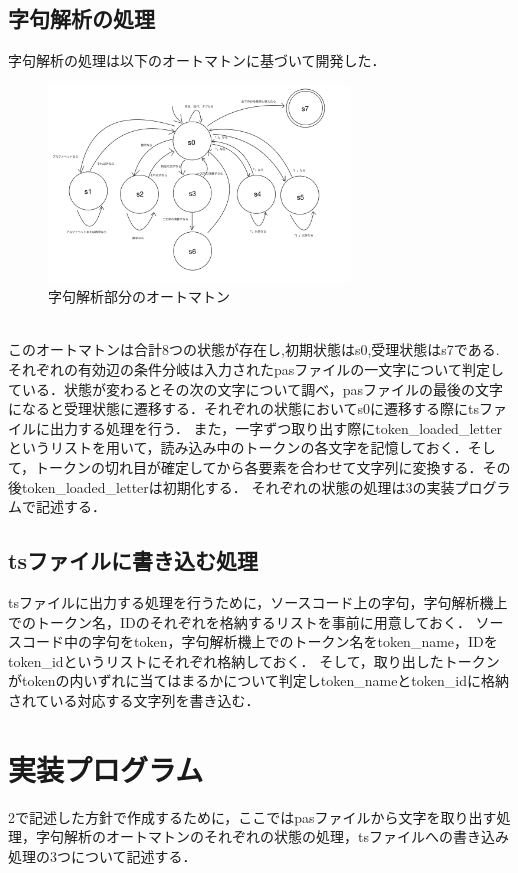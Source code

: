 \documentclass[dvipdfmx]{jarticle}
\begin{document}
\subsection{字句解析の処理}
字句解析の処理は以下のオートマトンに基づいて開発した．
\begin{figure}[h]
    \centering
    \includegraphics[width = 8cm, angle = -90]{automaton.png}
    \caption{字句解析部分のオートマトン}
\end{figure}
\\このオートマトンは合計8つの状態が存在し,初期状態はs0,受理状態はs7である.それぞれの有効辺の条件分岐は入力されたpasファイルの一文字について判定している．状態が変わるとその次の文字について調べ，pasファイルの最後の文字になると受理状態に遷移する．それぞれの状態においてs0に遷移する際にtsファイルに出力する処理を行う．
また，一字ずつ取り出す際にtoken\_loaded\_letterというリストを用いて，読み込み中のトークンの各文字を記憶しておく．そして，トークンの切れ目が確定してから各要素を合わせて文字列に変換する．その後token\_loaded\_letterは初期化する．
それぞれの状態の処理は3の実装プログラムで記述する．
\subsection{tsファイルに書き込む処理}
tsファイルに出力する処理を行うために，ソースコード上の字句，字句解析機上でのトークン名，IDのそれぞれを格納するリストを事前に用意しておく．\cite{1}
ソースコード中の字句をtoken，字句解析機上でのトークン名をtoken\_name，IDをtoken\_idというリストにそれぞれ格納しておく．
そして，取り出したトークンがtokenの内いずれに当てはまるかについて判定しtoken\_nameとtoken\_idに格納されている対応する文字列を書き込む．
\section{実装プログラム}
2で記述した方針で作成するために，ここではpasファイルから文字を取り出す処理，字句解析のオートマトンのそれぞれの状態の処理，tsファイルへの書き込み処理の3つについて記述する．
\end{document}
